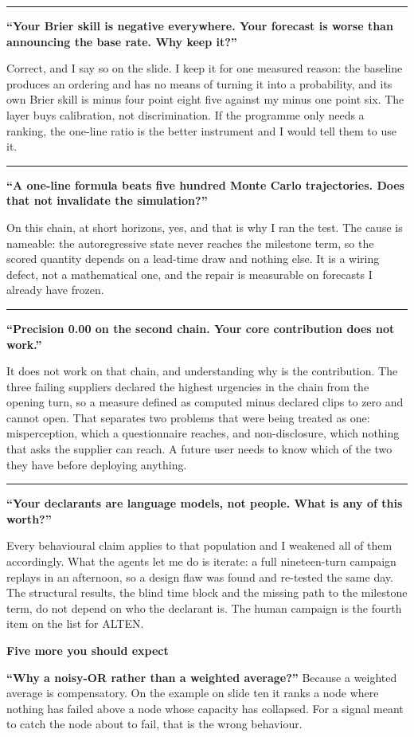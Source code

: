 \documentclass[a4paper,12pt]{article}
\newcommand{\SubHeading}[1]{%
  \needspace{3\baselineskip}%
  \vspace{10pt}%
  {\noindent\large\bfseries\color{altenAzureDark}#1\par}%
  \vspace{2pt}\par}
\newcommand{\Question}[1]{%
  \needspace{3\baselineskip}%
  \vspace{6pt}%
  \noindent\textcolor{altenOchreDark}{\rule{2.5pt}{\baselineskip}}\hspace{6pt}%
  \parbox[t]{\dimexpr\linewidth-14pt}{\textbf{#1}}%
  \vspace{5pt}\par}
\begin{document}
\Question{``Your Brier skill is negative everywhere. Your forecast is worse than announcing the base rate. Why keep it?''}
Correct, and I say so on the slide. I keep it for one measured reason: the baseline produces an ordering and has no means of turning it into a probability, and its own Brier skill is minus four point eight five against my minus one point six. The layer buys calibration, not discrimination. If the programme only needs a ranking, the one-line ratio is the better instrument and I would tell them to use it.

\Question{``A one-line formula beats five hundred Monte Carlo trajectories. Does that not invalidate the simulation?''}
On this chain, at short horizons, yes, and that is why I ran the test. The cause is nameable: the autoregressive state never reaches the milestone term, so the scored quantity depends on a lead-time draw and nothing else. It is a wiring defect, not a mathematical one, and the repair is measurable on forecasts I already have frozen.

\Question{``Precision 0.00 on the second chain. Your core contribution does not work.''}
It does not work on that chain, and understanding why is the contribution. The three failing suppliers declared the highest urgencies in the chain from the opening turn, so a measure defined as computed minus declared clips to zero and cannot open. That separates two problems that were being treated as one: misperception, which a questionnaire reaches, and non-disclosure, which nothing that asks the supplier can reach. A future user needs to know which of the two they have before deploying anything.

\Question{``Your declarants are language models, not people. What is any of this worth?''}
Every behavioural claim applies to that population and I weakened all of them accordingly. What the agents let me do is iterate: a full nineteen-turn campaign replays in an afternoon, so a design flaw was found and re-tested the same day. The structural results, the blind time block and the missing path to the milestone term, do not depend on who the declarant is. The human campaign is the fourth item on the list for ALTEN.

\SubHeading{Five more you should expect}
\textbf{``Why a noisy-OR rather than a weighted average?''} Because a weighted average is compensatory. On the example on slide ten it ranks a node where nothing has failed above a node whose capacity has collapsed. For a signal meant to catch the node about to fail, that is the wrong behaviour.
\end{document}
